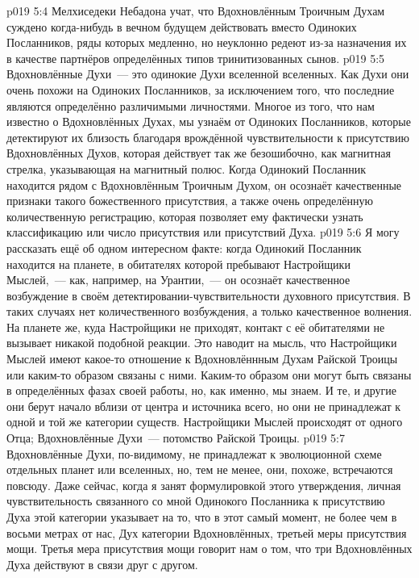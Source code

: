 \vs p019 5:4 Мелхиседеки Небадона учат, что Вдохновлённым Троичным Духам суждено когда\hyp{}нибудь в вечном будущем действовать вместо Одиноких Посланников, ряды которых медленно, но неуклонно редеют из\hyp{}за назначения их в качестве партнёров определённых типов тринитизованных сынов.
\vs p019 5:5 \pc Вдохновлённые Духи~--- это одинокие Духи вселенной вселенных. Как Духи они очень похожи на Одиноких Посланников, за исключением того, что последние являются определённо различимыми личностями. Многое из того, что нам известно о Вдохновлённых Духах, мы узнаём от Одиноких Посланников, которые детектируют их близость благодаря врождённой чувствительности к присутствию Вдохновлённых Духов, которая действует так же безошибочно, как магнитная стрелка, указывающая на магнитный полюс. Когда Одинокий Посланник находится рядом с Вдохновлённым Троичным Духом, он осознаёт качественные признаки такого божественного присутствия, а также очень определённую количественную регистрацию, которая позволяет ему фактически узнать классификацию или число присутствия или присутствий Духа.
\vs p019 5:6 Я могу рассказать ещё об одном интересном факте: когда Одинокий Посланник находится на планете, в обитателях которой пребывают Настройщики Мыслей,~--- как, например, на Урантии,~--- он осознаёт качественное возбуждение в своём детектировании\hyp{}чувствительности духовного присутствия. В таких случаях нет количественного возбуждения, а только качественное волнения. На планете же, куда Настройщики не приходят, контакт с её обитателями не вызывает никакой подобной реакции. Это наводит на мысль, что Настройщики Мыслей имеют какое\hyp{}то отношение к Вдохновлённным Духам Райской Троицы или каким\hyp{}то образом связаны с ними. Каким\hyp{}то образом они могут быть связаны в определённых фазах своей работы, но, как именно, мы знаем. И те, и другие они берут начало вблизи от  центра и источника всего, но они не принадлежат к одной и той же категории существ. Настройщики Мыслей происходят от одного Отца; Вдохновлённые Духи~--- потомство Райской Троицы.
\vs p019 5:7 Вдохновлённые Духи, по\hyp{}видимому, не принадлежат к эволюционной схеме отдельных планет или вселенных, но, тем не менее, они, похоже, встречаются повсюду. Даже сейчас, когда я занят формулировкой этого утверждения, личная чувствительность связанного со мной Одинокого Посланника к присутствию Духа этой категории указывает на то, что в этот самый момент, не более чем в восьми метрах от нас, Дух категории Вдохновлённых, третьей меры присутствия мощи. Третья мера присутствия мощи говорит нам о том, что три Вдохновлённых Духа действуют в связи друг с другом.

